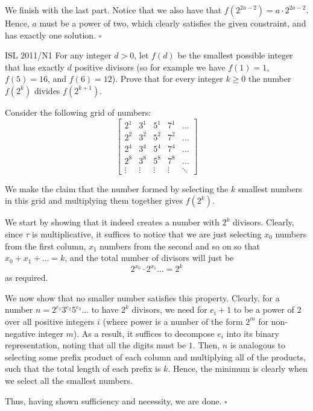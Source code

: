 \documentclass{article}
\begin{document}
We finish with the last part. Notice that we also have that $f(2^{2a-2}) = a\cdot 2^{2a-2}$. Hence, $a$ must be a power of two, which clearly satisfies the given constraint, and has exactly one solution. $\square$

\begin{problem}[3.7.16]{ISL 2011/N1}
For any integer $d > 0$, let $f(d)$ be the smallest possible integer that has exactly $d$ positive divisors (so for example we have $f(1) = 1$, $f(5) = 16$, and $f(6) = 12$). Prove that for every integer $k \ge 0$ the number $f\left(2^k\right)$ divides $f\left(2^{k+1}\right)$.
\end{problem}

Consider the following grid of numbers:
\[\begin{bmatrix}
2^1 & 3^1 & 5^1 & 7^1 & \dots \\
2^2 & 3^2 & 5^2 & 7^2 & \dots \\
2^4 & 3^4 & 5^4 & 7^4 & \dots \\
2^8 & 3^8 & 5^8 & 7^8 & \dots \\
\vdots & \vdots & \vdots & \vdots & \ddots
\end{bmatrix}\]

We make the claim that the number formed by selecting the $k$ smallest numbers in this grid and multiplying them together gives $f\left(2^k\right)$.

We start by showing that it indeed creates a number with $2^k$ divisors. Clearly, since $\tau$ is multiplicative, it suffices to notice that we are just selecting $x_0$ numbers from the first column, $x_1$ numbers from the second and so on so that $x_0+x_1+\dots = k$, and the total number of divisors will just be \[2^{x_0}\cdot 2^{x_1}\dots = 2^k\] as required.

We now show that no smaller number satisfies this property. Clearly, for a number $n = 2^{e_1}3^{e_2}5^{e_3}\dots$ to have $2^k$ divisors, we need for $e_i+1$ to be a power of $2$ over all positive integers $i$ (where power is a number of the form $2^m$ for non-negative integer $m$). As a result, it suffices to decompose $e_i$ into its binary representation, noting that all the digits must be $1$. Then, $n$ is analogous to selecting some prefix product of each column and multiplying all of the products, such that the total length of each prefix is $k$. Hence, the minimum is clearly when we select all the smallest numbers.

Thus, having shown sufficiency and necessity, we are done. $\square$
\end{document}
